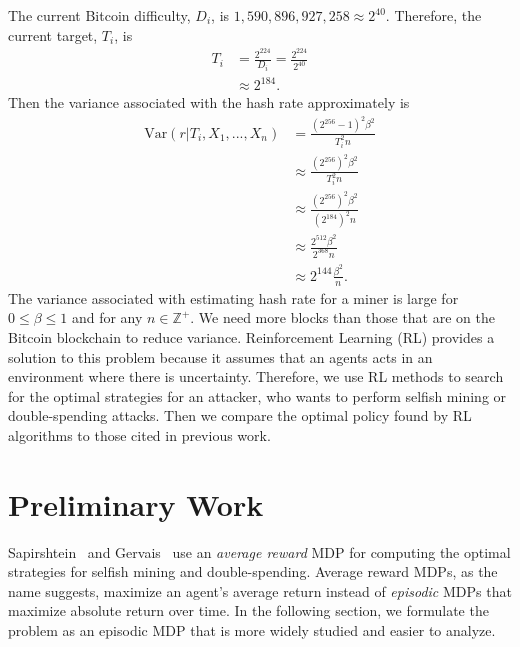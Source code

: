 The current Bitcoin difficulty, $D_i$, is $1,590,896,927,258 \approx 2^{40}$. Therefore, the current target, $T_i$, is
\begin{align}
T_i &= \frac{2^{224}}{D_i} = \frac{2^{224}}{2^{40}} \\
&\approx 2^{184}.
\end{align}
Then the variance associated with the hash rate approximately is
\begin{align}
\text{Var}(r|T_i,X_1,...,X_n) &= \frac{(2^{256}-1)^2\beta^2}{T_i^2n} \\
&\approx  \frac{(2^{256})^2\beta^2}{T_i^2n} \\
&\approx  \frac{(2^{256})^2\beta^2}{(2^{184})^2n} \\
&\approx  \frac{2^{512}\beta^2}{2^{368}n} \\
&\approx  2^{144}\frac{\beta^2}{n}.
\end{align}
The variance associated with estimating hash rate for a miner is large for $0 \leq \beta \leq 1$ and for any $n \in \mathbb{Z}^+ $. We need more blocks than those that are on the Bitcoin blockchain to reduce variance. Reinforcement Learning (RL) provides a solution to this problem because it assumes that an agents acts in an environment where there is uncertainty. Therefore, we use RL methods to search for the optimal strategies for an attacker, who wants to perform selfish mining or double-spending attacks. Then we compare the optimal policy found by RL algorithms to those cited in previous work.

\section{Preliminary Work}
Sapirshtein~\cite{sapirshtein:2015} and Gervais~\cite{Gervais:2016} use an {\em average reward} MDP for computing the optimal strategies for selfish mining and double-spending. Average reward MDPs, as the name suggests, maximize an agent's average return instead of {\em episodic} MDPs that maximize absolute return over time. In the following section, we formulate the problem as an episodic MDP that is more widely studied and easier to analyze.

